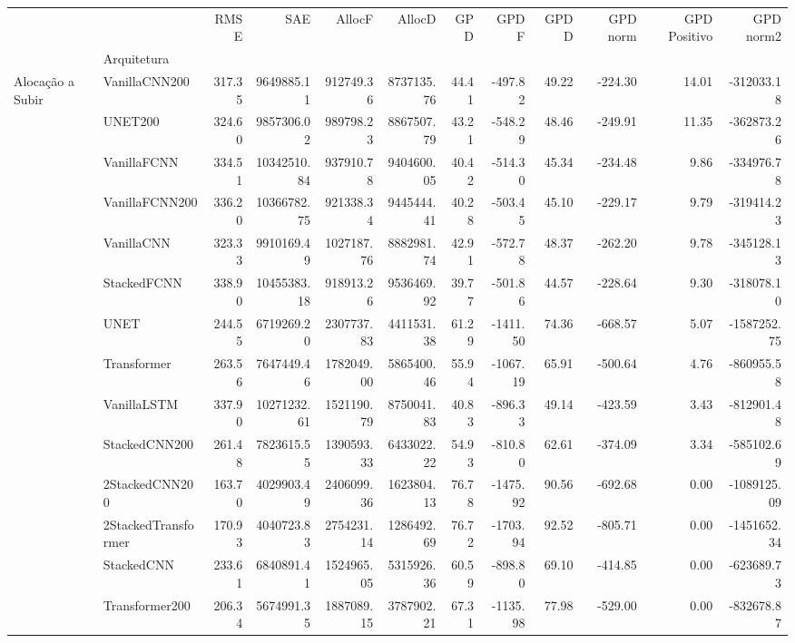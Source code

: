 \begin{tabular}{llrrrrrrrrrr}
\toprule
 &  & RMSE & SAE & AllocF & AllocD & GPD & GPD F & GPD D & GPD norm & GPD Positivo & GPD norm2 \\
 & Arquitetura &  &  &  &  &  &  &  &  &  &  \\
\midrule
\multirow[t]{14}{*}{Alocação a Subir} & VanillaCNN200 & 317.35 & 9649885.11 & 912749.36 & 8737135.76 & 44.41 & -497.82 & 49.22 & -224.30 & 14.01 & -312033.18 \\
 & UNET200 & 324.60 & 9857306.02 & 989798.23 & 8867507.79 & 43.21 & -548.29 & 48.46 & -249.91 & 11.35 & -362873.26 \\
 & VanillaFCNN & 334.51 & 10342510.84 & 937910.78 & 9404600.05 & 40.42 & -514.30 & 45.34 & -234.48 & 9.86 & -334976.78 \\
 & VanillaFCNN200 & 336.20 & 10366782.75 & 921338.34 & 9445444.41 & 40.28 & -503.45 & 45.10 & -229.17 & 9.79 & -319414.23 \\
 & VanillaCNN & 323.33 & 9910169.49 & 1027187.76 & 8882981.74 & 42.91 & -572.78 & 48.37 & -262.20 & 9.78 & -345128.13 \\
 & StackedFCNN & 338.90 & 10455383.18 & 918913.26 & 9536469.92 & 39.77 & -501.86 & 44.57 & -228.64 & 9.30 & -318078.10 \\
 & UNET & 244.55 & 6719269.20 & 2307737.83 & 4411531.38 & 61.29 & -1411.50 & 74.36 & -668.57 & 5.07 & -1587252.75 \\
 & Transformer & 263.56 & 7647449.46 & 1782049.00 & 5865400.46 & 55.94 & -1067.19 & 65.91 & -500.64 & 4.76 & -860955.58 \\
 & VanillaLSTM & 337.90 & 10271232.61 & 1521190.79 & 8750041.83 & 40.83 & -896.33 & 49.14 & -423.59 & 3.43 & -812901.48 \\
 & StackedCNN200 & 261.48 & 7823615.55 & 1390593.33 & 6433022.22 & 54.93 & -810.80 & 62.61 & -374.09 & 3.34 & -585102.69 \\
 & 2StackedCNN200 & 163.70 & 4029903.49 & 2406099.36 & 1623804.13 & 76.78 & -1475.92 & 90.56 & -692.68 & 0.00 & -1089125.09 \\
 & 2StackedTransformer & 170.93 & 4040723.83 & 2754231.14 & 1286492.69 & 76.72 & -1703.94 & 92.52 & -805.71 & 0.00 & -1451652.34 \\
 & StackedCNN & 233.61 & 6840891.41 & 1524965.05 & 5315926.36 & 60.59 & -898.80 & 69.10 & -414.85 & 0.00 & -623689.73 \\
 & Transformer200 & 206.34 & 5674991.35 & 1887089.15 & 3787902.21 & 67.31 & -1135.98 & 77.98 & -529.00 & 0.00 & -832678.87 \\

\end{tabular}
